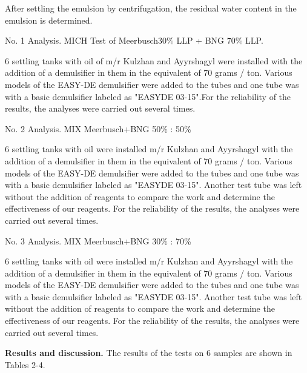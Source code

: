 \begin{multicols}{2}
After settling the emulsion by centrifugation, the residual water
content in the emulsion is determined.

No. 1 Analysis. MICH Test of Meerbusch30\% LLP + BNG 70\% LLP.

6 settling tanks with oil of m/r Kulzhan and Ayyrshagyl were installed
with the addition of a demulsifier in them in the equivalent of 70 grams
/ ton. Various models of the EASY-DE demulsifier were added to the tubes
and one tube was with a basic demulsifier labeled as "EASYDE 03-15".For
the reliability of the results, the analyses were carried out several
times.

No. 2 Analysis. MIX Meerbusch+BNG 50\% : 50\%

6 settling tanks with oil were installed m/r Kulzhan and Ayyrshagyl with
the addition of a demulsifier in them in the equivalent of 70 grams /
ton. Various models of the EASY-DE demulsifier were added to the tubes
and one tube was with a basic demulsifier labeled as "EASYDE 03-15".
Another test tube was left without the addition of reagents to compare
the work and determine the effectiveness of our reagents. For the
reliability of the results, the analyses were carried out several times.

No. 3 Analysis. MIX Meerbusch+BNG 30\% : 70\%

6 settling tanks with oil were installed m/r Kulzhan and Ayyrshagyl with
the addition of a demulsifier in them in the equivalent of 70 grams /
ton. Various models of the EASY-DE demulsifier were added to the tubes
and one tube was with a basic demulsifier labeled as "EASYDE 03-15".
Another test tube was left without the addition of reagents to compare
the work and determine the effectiveness of our reagents. For the
reliability of the results, the analyses were carried out several times.

{\bfseries Results and discussion.} The results of the tests on 6 samples
are shown in Tables 2-4.
\end{multicols}

